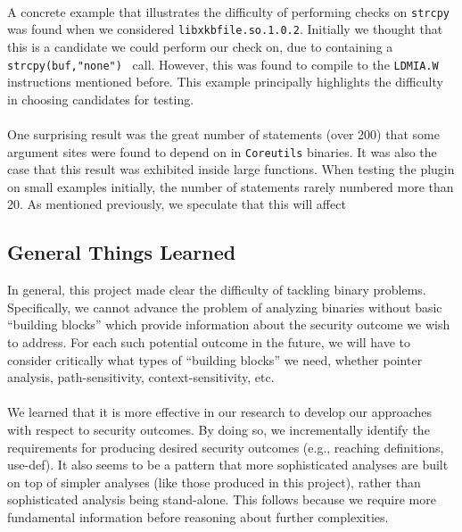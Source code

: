 \documentclass[letterpaper,11pt]{article}
\begin{document}
\paragraph{}
A concrete example that illustrates the difficulty of performing checks on
\texttt{strcpy} was found when we considered \texttt{libxkbfile.so.1.0.2}.
Initially we thought that this is a candidate we could perform our check on,
due to containing a \texttt{strcpy(buf,"none")}~\cite{xorg} call. However, this was found
to compile to the \texttt{LDMIA.W} instructions mentioned before. This example
principally highlights the difficulty in choosing candidates for testing.

\paragraph{} 
One surprising result was the great number of statements (over
200) that some argument sites were found to depend on in \texttt{Coreutils}
binaries. It was also the case that this result was exhibited inside large
functions. When testing the plugin on small examples initially, the number of
statements rarely numbered more than 20. As mentioned previously, we speculate
that this will affect

\subsection{General Things Learned}

In general, this project made clear the difficulty of tackling binary
problems. Specifically, we cannot advance the problem of analyzing binaries
without basic ``building blocks'' which provide information about the security
outcome we wish to address. For each such potential outcome in the future,
we will have to consider critically what types of ``building blocks'' we need,
whether pointer analysis, path-sensitivity, context-sensitivity, etc.

\paragraph{}
We learned that it is more effective in our research to develop our approaches
with respect to security outcomes. By doing so, we incrementally identify the
requirements for producing desired security outcomes (e.g., reaching
definitions, use-def). It also seems to be a pattern that more sophisticated
analyses are built on top of simpler analyses (like those produced in this
project), rather than sophisticated analysis being stand-alone. This follows
because we require more fundamental information before reasoning about
further complexities.
\end{document}
